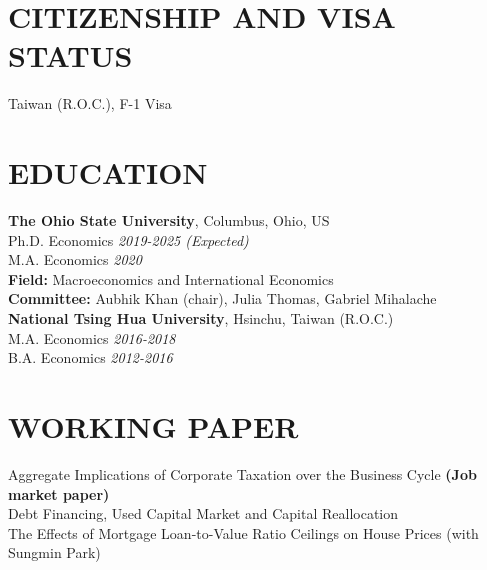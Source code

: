 \documentclass[12pt]{res} %
\begin{document}
\begin{resume}

\section{CITIZENSHIP AND VISA STATUS}
\vspace{8pt} %
Taiwan (R.O.C.), F-1 Visa


\section{EDUCATION}
\vspace{8pt} %
{\bf The Ohio State University}, Columbus, Ohio, US \\
Ph.D. Economics \hfill  \textit{2019-2025 (\textit{Expected})} \\
M.A. Economics \hfill  \textit{2020} \\
\textbf{Field: } Macroeconomics and International Economics \\
\textbf{Committee: } Aubhik Khan (chair), Julia Thomas, Gabriel Mihalache \\

{\bf National Tsing Hua University}, Hsinchu, Taiwan (R.O.C.) \\
M.A. Economics \hfill  \textit{2016-2018} \\
B.A. Economics \hfill  \textit{2012-2016}


\section{WORKING PAPER}
\label{sec:research_experience}
\vspace{8pt} %
Aggregate Implications of Corporate Taxation over the Business Cycle \textbf{(Job market paper)} \\
Debt Financing, Used Capital Market and Capital Reallocation \\
The Effects of Mortgage Loan-to-Value Ratio Ceilings on House Prices (with Sungmin Park)




\end{resume}
\end{document}
